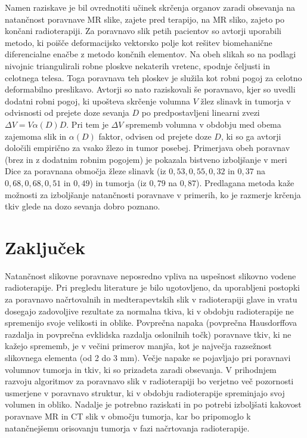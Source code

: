 \documentclass[journal]{IEEEtran}
\begin{document}
Namen raziskave \cite{al-mayah2015} je bil ovrednotiti učinek skrčenja organov zaradi obsevanja na natančnost poravnave MR slike, zajete pred terapijo, na MR sliko, zajeto po končani radioterapiji. Za poravnavo slik petih pacientov so avtorji uporabili metodo, ki poišče deformacijsko vektorsko polje kot rešitev biomehanične diferencialne enačbe z metodo končnih elementov. Na obeh slikah so na podlagi nivojnic triangulirali robne ploskve nekaterih vretenc, spodnje čeljusti in celotnega telesa. Toga poravnava teh ploskev je služila kot robni pogoj za celotno deformabilno preslikavo. Avtorji so nato raziskovali še poravnavo, kjer so uvedli dodatni robni pogoj, ki upošteva skrčenje volumna $V$ žlez slinavk in tumorja v odvisnosti od prejete doze sevanja $D$ po predpostavljeni linearni zvezi $\Delta V = V\alpha(D)D$. Pri tem je $\Delta V$ sprememb volumna v obdobju med obema zajemoma slik in $\alpha(D)$ faktor, odvisen od prejete doze $D$, ki so ga avtorji določili empirično za vsako žlezo in tumor posebej. Primerjava obeh poravnav (brez in z dodatnim robnim pogojem) je pokazala bistveno izboljšanje v meri Dice za poravnana območja žleze slinavk (iz $0{,}53, 0{,}55, 0{,}32$ in $0{,}37$ na $0{,}68, 0{,}68, 0{,}51$ in $0{,}49$) in tumorja (iz $0{,}79$ na $0{,}87$). Predlagana metoda kaže možnosti za izboljšanje natančnosti poravnave v primerih, ko je razmerje krčenja tkiv glede na dozo sevanja dobro poznano.

\section{Zaključek}

Natančnost slikovne poravnave neposredno vpliva na uspešnost slikovno vodene radioterapije. Pri pregledu literature je bilo ugotovljeno, da uporabljeni postopki za poravnavo načrtovalnih in medterapevtskih slik v radioterapiji glave in vratu dosegajo zadovoljive rezultate za normalna tkiva, ki v obdobju radioterapije ne spremenijo svoje velikosti in oblike. Povprečna napaka (povprečna Hausdorffova razdalja in povprečna evklidska razdalja oslonilnih točk) poravnave tkiv, ki ne kažejo sprememb, je v večini primerov manjša, kot je največja razsežnost slikovnega elementa (od 2 do 3 mm). Večje napake se pojavljajo pri poravnavi volumnov tumorja in tkiv, ki so prizadeta zaradi obsevanja. V prihodnjem razvoju algoritmov za poravnavo slik v radioterapiji bo verjetno več pozornosti usmerjene v poravnavo struktur, ki v obdobju radioterapije spreminjajo svoj volumen in obliko. Nadalje je potrebno raziskati in po potrebi izboljšati kakovost poravnave MR in CT slik v območju tumorja, kar bo pripomoglo k natančnejšemu orisovanju tumorja v fazi načrtovanja radioterapije.
\end{document}
